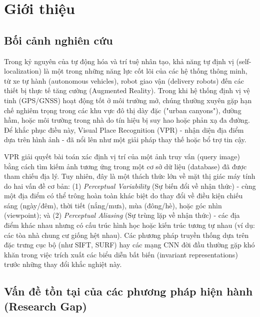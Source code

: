 \documentclass[12pt,a4paper]{article}
\begin{document}
    \newpage

    \tableofcontents
    \newpage

    \section{Giới thiệu}

    \subsection{Bối cảnh nghiên cứu}

    Trong kỷ nguyên của tự động hóa và trí tuệ nhân tạo, khả năng tự định vị (self-localization) là một trong những năng lực cốt lõi của các hệ thống thông minh, từ xe tự hành (autonomous vehicles), robot giao vận (delivery robots) đến các thiết bị thực tế tăng cường (Augmented Reality). Trong khi hệ thống định vị vệ tinh (GPS/GNSS) hoạt động tốt ở môi trường mở, chúng thường xuyên gặp hạn chế nghiêm trọng trong các khu vực đô thị dày đặc ("urban canyons"), đường hầm, hoặc môi trường trong nhà do tín hiệu bị suy hao hoặc phản xạ đa đường. Để khắc phục điều này, Visual Place Recognition (VPR) - nhận diện địa điểm dựa trên hình ảnh - đã nổi lên như một giải pháp thay thế hoặc bổ trợ tin cậy.

    VPR giải quyết bài toán xác định vị trí của một ảnh truy vấn (query image) bằng cách tìm kiếm ảnh tương ứng trong một cơ sở dữ liệu (database) đã được tham chiếu địa lý. Tuy nhiên, đây là một thách thức lớn về mặt thị giác máy tính do hai vấn đề cơ bản: (1) \textit{Perceptual Variability} (Sự biến đổi về nhận thức) - cùng một địa điểm có thể trông hoàn toàn khác biệt do thay đổi về điều kiện chiếu sáng (ngày/đêm), thời tiết (nắng/mưa), mùa (đông/hè), hoặc góc nhìn (viewpoint); và (2) \textit{Perceptual Aliasing} (Sự trùng lặp về nhận thức) - các địa điểm khác nhau nhưng có cấu trúc hình học hoặc kiến trúc tương tự nhau (ví dụ: các tòa nhà chung cư giống hệt nhau). Các phương pháp truyền thống dựa trên đặc trưng cục bộ (như SIFT, SURF) hay các mạng CNN đời đầu thường gặp khó khăn trong việc trích xuất các biểu diễn bất biến (invariant representations) trước những thay đổi khắc nghiệt này.

    \subsection{Vấn đề tồn tại của các phương pháp hiện hành (Research Gap)}
\end{document}
